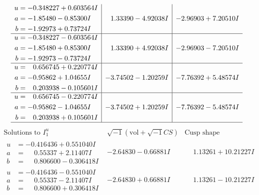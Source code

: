 \documentclass[1p]{elsarticle_modified}
\theoremstyle{definition}
\newcommand{\I}{\sqrt{-1}}
\begin{document}
$$\begin{array}{c|c|c}
\begin{aligned}
u &= -0.348227 + 0.603564 I \\
a &= -1.85480 - 0.85300 I \\
b &= -1.92973 + 0.73724 I\end{aligned}
 & \phantom{-}1.33390 - 4.92038 I & -2.96903 + 7.20510 I \\ \hline\begin{aligned}
u &= -0.348227 - 0.603564 I \\
a &= -1.85480 + 0.85300 I \\
b &= -1.92973 - 0.73724 I\end{aligned}
 & \phantom{-}1.33390 + 4.92038 I & -2.96903 - 7.20510 I \\ \hline\begin{aligned}
u &= \phantom{-}0.656745 + 0.220774 I \\
a &= -0.95862 + 1.04655 I \\
b &= \phantom{-}0.203938 - 0.105601 I\end{aligned}
 & -3.74502 - 1.20259 I & -7.76392 + 5.48574 I \\ \hline\begin{aligned}
u &= \phantom{-}0.656745 - 0.220774 I \\
a &= -0.95862 - 1.04655 I \\
b &= \phantom{-}0.203938 + 0.105601 I\end{aligned}
 & -3.74502 + 1.20259 I & -7.76392 - 5.48574 I\\
 \hline 
 \end{array}$$\newpage$$\begin{array}{c|c|c}  
\text{Solutions to }I^u_{1}& \I (\text{vol} + \sqrt{-1}CS) & \text{Cusp shape}\\
 \hline 
\begin{aligned}
u &= -0.416436 + 0.551040 I \\
a &= \phantom{-}0.55337 + 2.11407 I \\
b &= \phantom{-}0.806600 - 0.306418 I\end{aligned}
 & -2.64830 - 0.66881 I & \phantom{-}1.13261 + 10.21227 I \\ \hline\begin{aligned}
u &= -0.416436 - 0.551040 I \\
a &= \phantom{-}0.55337 - 2.11407 I \\
b &= \phantom{-}0.806600 + 0.306418 I\end{aligned}
 & -2.64830 + 0.66881 I & \phantom{-}1.13261 - 10.21227 I \\ \hline\begin{aligned}

\end{aligned}
\end{array}$$
\end{document}
